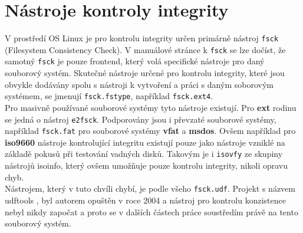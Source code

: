 \section{Nástroje kontroly integrity}
V prostředí OS Linux je pro kontrolu integrity určen primárně nástroj \texttt{fsck} (Filesystem Consistency Check). V manuálové stránce k \texttt{fsck} \cite{man-fsck} se lze dočíst, že samotný \texttt{fsck} je pouze frontend, který volá specifické nástroje pro daný souborový systém. Skutečné nástroje určené pro kontrolu integrity, které jsou obvykle dodávány spolu s nástroji k vytvoření a práci s daným soborovým systémem, se jmenují \texttt{fsck.fstype}, například \texttt{fsck.ext4}.\\
Pro masivně používané souborové systémy tyto nástroje existují. Pro \textbf{ext} rodinu se jedná o nástroj \texttt{e2fsck}. Podporovány jsou i převzaté souborové systémy, například \texttt{fsck.fat} pro souborové systémy \textbf{vfat} a \textbf{msdos}. Ovšem například pro \textbf{iso9660} nástroje kontrolující integritu existují pouze jako nástroje vzniklé na základě pokusů při testování vadných disků. Takovým je i \texttt{isovfy} \cite{man-isovfy} ze skupiny nástrojů isoinfo, který ovšem umožňuje pouze kontrolu integrity, nikoli opravu chyb.\\
Nástrojem, který v tuto chvíli chybí, je podle všeho \texttt{fsck.udf}. Projekt s názvem udftools \cite{udftools-sourceforge}, byl autorem opuštěn v roce 2004 a nástroj pro kontrolu konzistence nebyl nikdy započat a proto se v dalších částech práce soustředím právě na tento souborový systém. 

